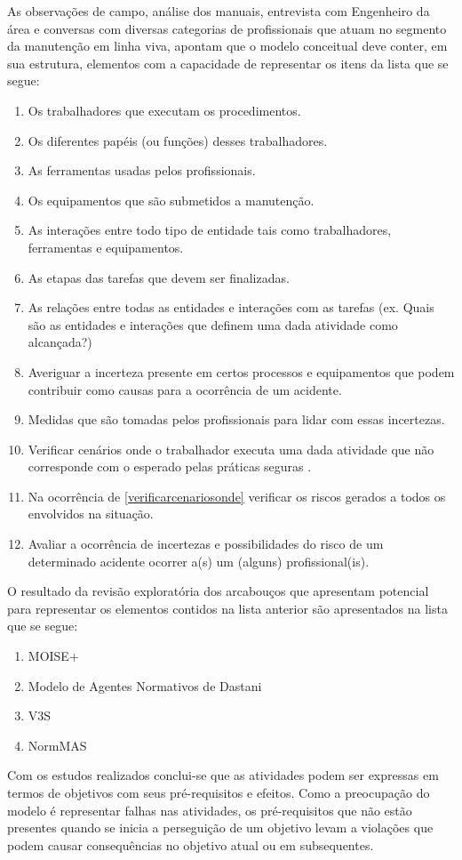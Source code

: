 As observações de campo, análise dos manuais, entrevista com Engenheiro da área e conversas com diversas categorias de profissionais que atuam no segmento da manutenção em linha viva, apontam que o modelo conceitual deve conter, em sua estrutura, elementos com a capacidade de representar os itens da lista que se segue:

\begin{enumerate}
	\item Os trabalhadores que executam os procedimentos.
	\item Os diferentes papéis (ou funções) desses trabalhadores.
	\item As ferramentas usadas pelos profissionais.
	\item Os equipamentos que são submetidos a manutenção.
	\item As interações entre todo tipo de entidade tais como trabalhadores, ferramentas e equipamentos.
	\item As etapas das tarefas que devem ser finalizadas. 
	\item As relações entre todas as entidades e interações com as tarefas (ex. Quais são as entidades e interações que definem uma dada atividade como alcançada?)
	\item Averiguar a incerteza presente em certos processos e equipamentos que podem contribuir como causas para a ocorrência de um acidente.
	\item Medidas que são tomadas pelos profissionais para lidar com essas incertezas.
	\item Verificar cenários onde o trabalhador executa uma dada atividade que não corresponde com o esperado pelas práticas seguras \label{verificarcenariosonde}. 
	\item Na ocorrência de \ref{verificarcenariosonde} verificar os riscos gerados a todos os envolvidos na situação.
	\item Avaliar a ocorrência de incertezas e possibilidades do risco de um determinado acidente ocorrer a(s) um (alguns) profissional(is).
\end{enumerate}

O resultado da revisão exploratória dos arcabouços que apresentam potencial para representar os elementos contidos na lista anterior são apresentados na lista que se segue:

\begin{enumerate}
	\item MOISE+ \cite{moiseframeworktwo}
	\item Modelo de Agentes Normativos de Dastani \cite{dastaniframework}
	\item V3S \cite{v3sframework} 
	\item NormMAS \cite{normas}
\end{enumerate}

Com os estudos realizados conclui-se que as atividades podem ser expressas em termos de objetivos com seus pré-requisitos e efeitos. Como a preocupação do modelo é representar falhas nas atividades, os pré-requisitos que não estão presentes quando se inicia a perseguição de um objetivo levam a violações que podem causar consequências no objetivo atual ou em subsequentes.